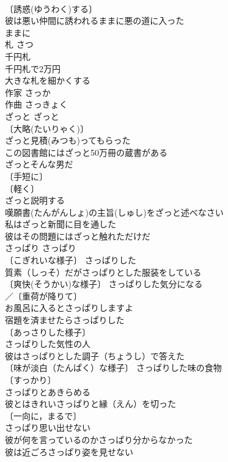 \documentclass[8pt]{extreport}
\begin{document}
\begin{CJK}{UTF8}{min}
\\	〔誘惑(ゆうわく)する〕
\\	彼は悪い仲間に誘われるままに悪の道に入った 
\\	ままに　
\\	札	さつ	
\\	千円札 
\\	千円札で2万円 
\\	大きな札を細かくする 
\\	作家	さっか	
\\	作曲	さっきょく	
\\	ざっと	ざっと	
\\	〔大略(たいりゃく)〕
\\	ざっと見積(みつも)ってもらった 
\\	この図書館にはざっと50万冊の蔵書がある 
\\	ざっとそんな男だ 
\\	〔手短に〕
\\	〔軽く〕
\\	ざっと説明する 
\\	嘆願書(たんがんしょ)の主旨(しゅし)をざっと述べなさい 
\\	私はざっと新聞に目を通した 
\\	彼はその問題にはざっと触れただけだ 
\\	さっぱり	さっぱり	
\\	〔こぎれいな様子〕 さっぱりした 
\\	質素（しっそ）だがさっぱりとした服装をしている 
\\	〔爽快(そうかい)な様子〕 さっぱりした気分になる 
\\	／〔重荷が降りて〕
\\	お風呂に入るとさっぱりしますよ 
\\	宿題を済ませたらさっぱりした 
\\	〔あっさりした様子〕　
\\	さっぱりした気性の人 
\\	彼はさっぱりとした調子（ちょうし）で答えた 
\\	〔味が淡白（たんぱく）な様子〕 さっぱりした味の食物 
\\	〔すっかり〕
\\	さっぱりとあきらめる 
\\	彼とはきれいさっぱりと縁（えん）を切った 
\\	〔一向に，まるで〕 
\\	さっぱり思い出せない 
\\	彼が何を言っているのかさっぱり分からなかった 
\\	彼は近ごろさっぱり姿を見せない 

\end{CJK}
\end{document}

